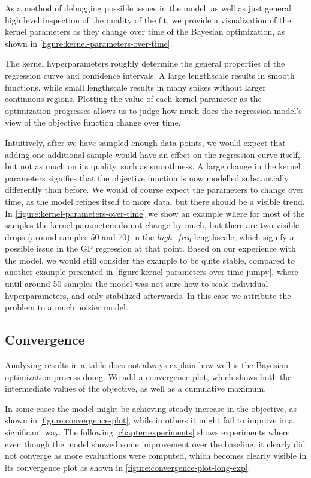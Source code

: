 As a method of debugging possible issues in the model, as well as just general high level inspection of the quality of the fit, we provide a visualization of the kernel parameters as they change over time of the Bayesian optimization, as shown in \autoref{figure:kernel-parameters-over-time}.

The kernel hyperparameters roughly determine the general properties of the regression curve and confidence intervals. A large lengthscale results in smooth functions, while small lengthscale results in many spikes without larger continuous regions. Plotting the value of each kernel parameter as the optimization progresses allows us to judge how much does the regression model's view of the objective function change over time.

Intuitively, after we have sampled enough data points, we would expect that adding one additional sample would have an effect on the regression curve itself, but not as much on its quality, such as smoothness. A large change in the kernel parameters signifies that the objective function is now modelled substantially differently than before. We would of course expect the parameters to change over time, as the model refines itself to more data, but there should be a visible trend. In \autoref{figure:kernel-parameters-over-time} we show an example where for most of the samples the kernel parameters do not change by much, but there are two visible drops (around samples 50 and 70) in the \emph{high\_freq} lengthscale, which signify a possible issue in the GP regression at that point. Based on our experience with the model, we would still consider the example to be quite stable, compared to another example presented in \autoref{figure:kernel-parameters-over-time-jumpy}, where until around 50 samples the model was not sure how to scale individual hyperparameters, and only stabilized afterwards. In this case we attribute the problem to a much noisier model.

\subsection{Convergence}
\label{section:convergence}

Analyzing results in a table does not always explain how well is the Bayesian optimization process doing. We add a convergence plot, which shows both the intermediate values of the objective, as well as a cumulative maximum.

In some cases the model might be achieving steady increase in the objective, as shown in \autoref{figure:convergence-plot}, while in others it might fail to improve in a significant way. The following \autoref{chapter:experiments} shows experiments where even though the model showed some improvement over the baseline, it clearly did not converge as more evaluations were computed, which becomes clearly visible in its convergence plot as shown in \autoref{figure:convergence-plot-long-exp}.

